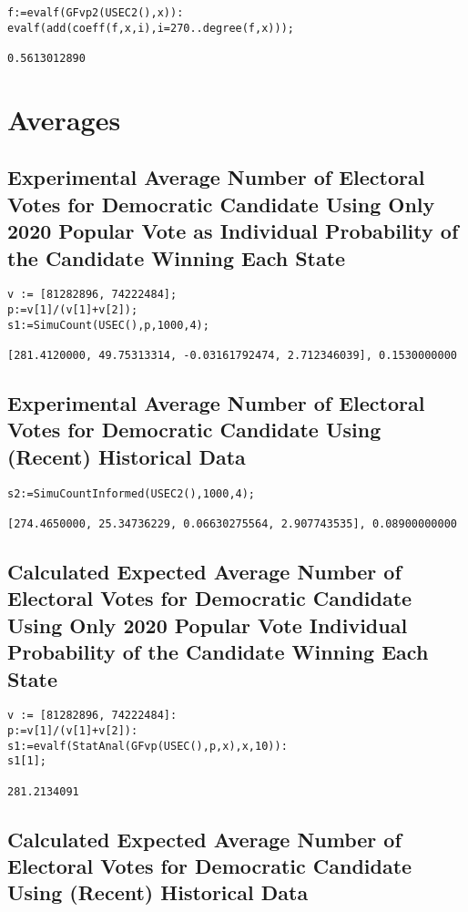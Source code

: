 \documentclass[12pt]{article}
\begin{document}
\begin{verbatim}
f:=evalf(GFvp2(USEC2(),x)):
evalf(add(coeff(f,x,i),i=270..degree(f,x)));

0.5613012890
\end{verbatim}

\section{Averages}
\subsection{Experimental Average Number of Electoral Votes for Democratic Candidate Using Only 2020 Popular Vote as Individual Probability of the Candidate Winning Each State}

\begin{verbatim}
v := [81282896, 74222484];
p:=v[1]/(v[1]+v[2]);
s1:=SimuCount(USEC(),p,1000,4);

[281.4120000, 49.75313314, -0.03161792474, 2.712346039], 0.1530000000
\end{verbatim}

\subsection{Experimental Average Number of Electoral Votes for Democratic Candidate Using (Recent) Historical Data}

\begin{verbatim}
s2:=SimuCountInformed(USEC2(),1000,4);

[274.4650000, 25.34736229, 0.06630275564, 2.907743535], 0.08900000000
\end{verbatim}

\subsection{Calculated Expected Average Number of Electoral Votes for Democratic Candidate Using Only 2020 Popular Vote Individual Probability of the Candidate Winning Each State}

\begin{verbatim}
v := [81282896, 74222484]:
p:=v[1]/(v[1]+v[2]):
s1:=evalf(StatAnal(GFvp(USEC(),p,x),x,10)):
s1[1];

281.2134091
\end{verbatim}

\subsection{Calculated Expected Average Number of Electoral Votes for Democratic Candidate Using (Recent) Historical Data}
\end{document}
